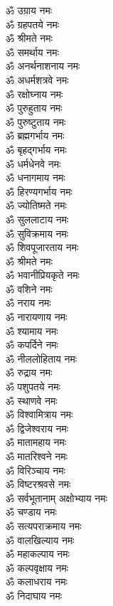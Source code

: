 \begin{multicols}{2}
\begin{flushleft}
ॐ उग्राय नमः\\
ॐ ग्रहपतये नमः\\
ॐ श्रीमते नमः\\
ॐ समर्थाय नमः\\
ॐ अनर्थनाशनाय नमः\\
ॐ अधर्मशत्रवे नमः\\
ॐ रक्षोघ्नाय नमः\\
ॐ पुरुहुताय नमः\hfill{}\\
ॐ पुरुष्टुताय नमः\\
ॐ ब्रह्मगर्भाय नमः\\
ॐ बृहद्गर्भाय नमः\\
ॐ धर्मधेनवे नमः\\
ॐ धनागमाय नमः\\
ॐ हिरण्यगर्भाय नमः\\
ॐ ज्योतिष्मते नमः\\
ॐ सुललाटाय नमः\\
ॐ सुविक्रमाय नमः\\
ॐ शिवपूजारताय नमः\hfill{}\\
ॐ श्रीमते नमः\\
ॐ भवानीप्रियकृते नमः\\
ॐ वशिने नमः\\
ॐ नराय नमः\\
ॐ नारायणाय नमः\\
ॐ श्यामाय नमः\\
ॐ कपर्दिने नमः\\
ॐ नीललोहिताय नमः\\
ॐ रुद्राय नमः\\
ॐ पशुपतये नमः\hfill{}\\
ॐ स्थाणवे नमः\\
ॐ विश्वामित्राय नमः\\
ॐ द्विजेश्वराय नमः\\
ॐ मातामहाय नमः\\
ॐ मातरिश्वने नमः\\
ॐ विरिञ्चाय नमः\\
ॐ विष्टरश्रवसे नमः\\
ॐ सर्वभूतानाम् अक्षोभ्याय नमः\\
ॐ चण्डाय नमः\\
ॐ सत्यपराक्रमाय नमः\hfill{}\\
ॐ वालखिल्याय नमः\\
ॐ महाकल्पाय नमः\\
ॐ कल्पवृक्षाय नमः\\
ॐ कलाधराय नमः\\
ॐ निदाघाय नमः\\

\end{flushleft}
\end{multicols}
